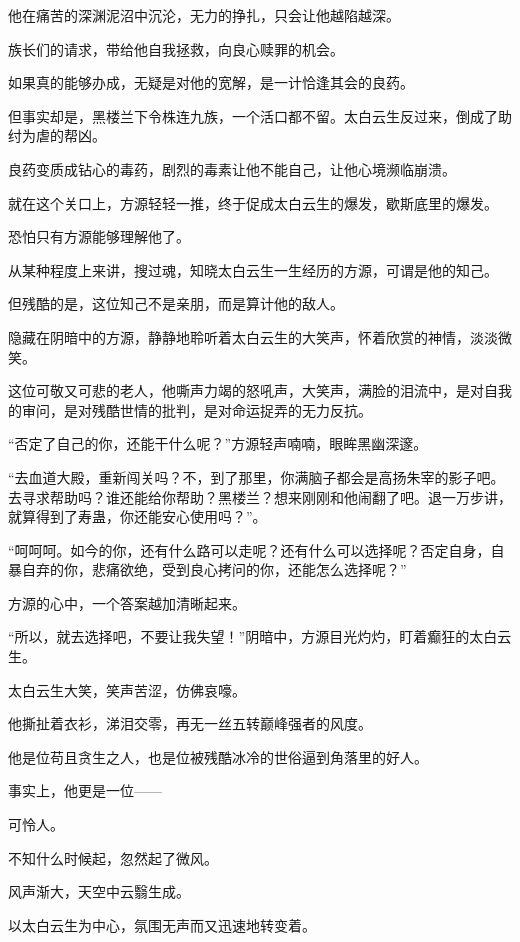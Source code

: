 \begin{this_body}
他在痛苦的深渊泥沼中沉沦，无力的挣扎，只会让他越陷越深。

族长们的请求，带给他自我拯救，向良心赎罪的机会。

如果真的能够办成，无疑是对他的宽解，是一计恰逢其会的良药。

但事实却是，黑楼兰下令株连九族，一个活口都不留。太白云生反过来，倒成了助纣为虐的帮凶。

良药变质成钻心的毒药，剧烈的毒素让他不能自己，让他心境濒临崩溃。

就在这个关口上，方源轻轻一推，终于促成太白云生的爆发，歇斯底里的爆发。

恐怕只有方源能够理解他了。

从某种程度上来讲，搜过魂，知晓太白云生一生经历的方源，可谓是他的知己。

但残酷的是，这位知己不是亲朋，而是算计他的敌人。

隐藏在阴暗中的方源，静静地聆听着太白云生的大笑声，怀着欣赏的神情，淡淡微笑。

这位可敬又可悲的老人，他嘶声力竭的怒吼声，大笑声，满脸的泪流中，是对自我的审问，是对残酷世情的批判，是对命运捉弄的无力反抗。

“否定了自己的你，还能干什么呢？”方源轻声喃喃，眼眸黑幽深邃。

“去血道大殿，重新闯关吗？不，到了那里，你满脑子都会是高扬朱宰的影子吧。去寻求帮助吗？谁还能给你帮助？黑楼兰？想来刚刚和他闹翻了吧。退一万步讲，就算得到了寿蛊，你还能安心使用吗？”。

“呵呵呵。如今的你，还有什么路可以走呢？还有什么可以选择呢？否定自身，自暴自弃的你，悲痛欲绝，受到良心拷问的你，还能怎么选择呢？”

方源的心中，一个答案越加清晰起来。

“所以，就去选择吧，不要让我失望！”阴暗中，方源目光灼灼，盯着癫狂的太白云生。

太白云生大笑，笑声苦涩，仿佛哀嚎。

他撕扯着衣衫，涕泪交零，再无一丝五转巅峰强者的风度。

他是位苟且贪生之人，也是位被残酷冰冷的世俗逼到角落里的好人。

事实上，他更是一位——

可怜人。

不知什么时候起，忽然起了微风。

风声渐大，天空中云翳生成。

以太白云生为中心，氛围无声而又迅速地转变着。


\end{this_body}
